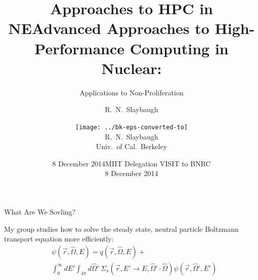 \documentclass[xcolor=x11names,compress]{beamer}
\title{Approaches to HPC in NE}
\author{R.\ N.\ Slaybaugh}
\date{8 December 2014}
\renewcommand{\(}{\begin{columns}}
\renewcommand{\)}{\end{columns}}
\newcommand{\<}[1]{\begin{column}{#1}}
\renewcommand{\>}{\end{column}}
\newcommand{\Macro}{\ensuremath{\Sigma}}
\newcommand{\vOmega}{\ensuremath{\hat{\Omega}}}
\begin{document}
\begin{frame}
\title{Advanced Approaches to High-Performance Computing in Nuclear:}
\subtitle{Applications to Non-Proliferation}
\author{\texttt{[image: ../bk-eps-converted-to]}\\R.\ N.\ Slaybaugh \\ Univ.\ of Cal.\ Berkeley}

\date{MIIT Delegation VISIT to BNRC \\ 8 December 2014}
\titlepage
\end{frame}

\begin{frame}{What Are We Sovling?}

    My group studies how to solve the steady state, neutral particle Boltzmann transport equation more efficiently:
    \begin{align}
    [\vOmega \cdot \nabla + \Macro(\vec{r}, E)] &\psi(\vec{r}, \vOmega, E)  =  q(\vec{r}, \vOmega, E) + \nonumber\\
     &\int_0^{\infty} dE' \int_{4\pi} d\vOmega' \:\Macro_{s}(\vec{r}, E' \to E,
     \vOmega' \cdot \vOmega) \psi(\vec{r}, \vOmega', E') \nonumber
    \end{align}
    

\end{frame}
\end{document}
